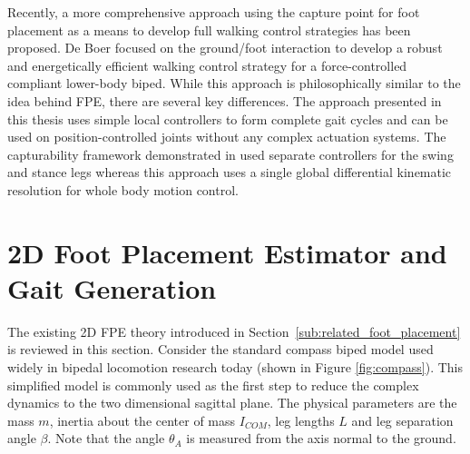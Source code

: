 Recently, a more comprehensive approach using the capture point for foot placement as a means to develop full walking control strategies has been proposed. De Boer \cite{DeBoer:2012wp} focused on the ground/foot interaction to develop a robust and energetically efficient walking control strategy for a force-controlled compliant lower-body biped. While this approach is philosophically similar to the idea behind FPE, there are several key differences. The approach presented in this thesis uses simple local controllers to form complete gait cycles and can be used on position-controlled joints without any complex actuation systems. The capturability framework demonstrated in \cite{Pratt01092012} used separate controllers for the swing and stance legs whereas this approach uses a single global differential kinematic resolution for whole body motion control.








\section{2D Foot Placement Estimator and Gait Generation} %
\label{sec:fpe_algorithm}
The existing 2D FPE theory introduced in Section~\ref{sub:related_foot_placement} is reviewed in this section. Consider the standard compass biped model used widely in bipedal locomotion research today (shown in Figure \ref{fig:compass}). This simplified model is commonly used as the first step to reduce the complex dynamics to the two dimensional sagittal plane. The physical parameters are the mass $m$, inertia about the center of mass $I_{COM}$, leg lengths $L$ and leg separation angle $\beta$. Note that the angle $\theta_A$ is measured from the axis normal to the ground. 

